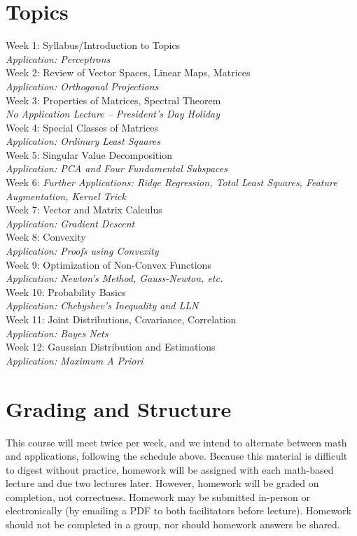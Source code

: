 \documentclass{article}
\begin{document}
\section{Topics}
\begin{multicols}{2}
\noindent
Week 1: Syllabus/Introduction to Topics \\
\textit{Application: Perceptrons} \\
Week 2: Review of Vector Spaces, Linear Maps, Matrices \\
\textit{Application: Orthogonal Projections} \\
Week 3: Properties of Matrices, Spectral Theorem \\
\textit{No Application Lecture -- President's Day Holiday}\\
Week 4: Special Classes of Matrices \\
\textit{Application: Ordinary Least Squares} \\
Week 5: Singular Value Decomposition\\
\textit{Application: PCA and Four Fundamental Subspaces} \\
Week 6: \textit{Further Applications: Ridge Regression, Total Least Squares, Feature Augmentation, Kernel Trick} \\
Week 7: Vector and Matrix Calculus \\
\textit{Application: Gradient Descent}\\
Week 8: Convexity \\
\textit{Application: Proofs using Convexity} \\
Week 9: Optimization of Non-Convex Functions \\
\textit{Application: Newton's Method, Gauss-Newton, etc.} \\
Week 10: Probability Basics \\
\textit{Application: Chebyshev's Inequality and LLN} \\
Week 11: Joint Distributions, Covariance, Correlation \\
\textit{Application: Bayes Nets} \\ 
Week 12: Gaussian Distribution and Estimations \\
\textit{Application: Maximum A Priori}
\end{multicols}

\section{Grading and Structure}
This course will meet twice per week, and we intend to alternate between math and applications, following the schedule above. Because this material is difficult to digest without practice, homework will be assigned with each math-based lecture and due two lectures later. However, homework will be graded on completion, not correctness. Homework may be submitted in-person or electronically (by emailing a PDF to both facilitators before lecture). Homework should not be completed in a group, nor should homework answers be shared. \\
\end{document}
